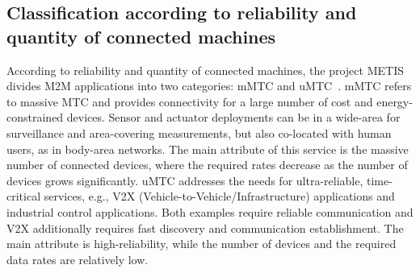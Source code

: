 









\subsection{Classification according to reliability and quantity of connected machines }
According to reliability and quantity of connected machines, 
the project METIS divides M2M applications into two categories: mMTC and uMTC~\cite{METIS15_concept}. 
mMTC refers to massive MTC and provides connectivity for a large number of cost and energy-constrained devices.
Sensor and actuator deployments can be in a wide-area for surveillance and area-covering measurements, but also co-located with human users, as in body-area networks. 
The main attribute of this service is the massive number of connected devices, where the required rates decrease as the number of devices grows significantly. 
uMTC addresses the needs for ultra-reliable, time-critical services, e.g., V2X (Vehicle-to-Vehicle/Infrastructure) applications and industrial control applications. 
Both examples require reliable communication and V2X additionally requires fast discovery and communication establishment. 
The main attribute is high-reliability, while the number of devices and the required data rates are relatively low. 
